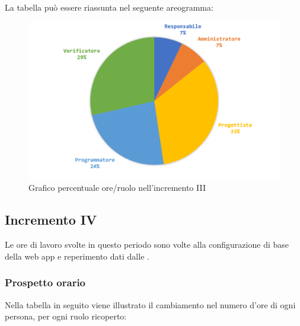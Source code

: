 			La tabella può essere riassunta nel seguente areogramma:
			\begin{figure}[H]
				\centering
				\includegraphics[width=0.8\linewidth]{images/consuntivo/ConsIncr3-2.png}
				\caption{Grafico percentuale ore/ruolo nell'incremento III}
				\label{fig:grafico costi ruolo incremento III}
			\end{figure}
			\pagebreak

		
		\subsection{Incremento IV}
		Le ore di lavoro svolte in questo periodo sono volte alla configurazione di base della web app e reperimento dati dalle .
		\subsubsection{Prospetto orario}
			Nella tabella in seguito viene illustrato il cambiamento nel numero d'ore di ogni persona, per ogni ruolo ricoperto:
			
